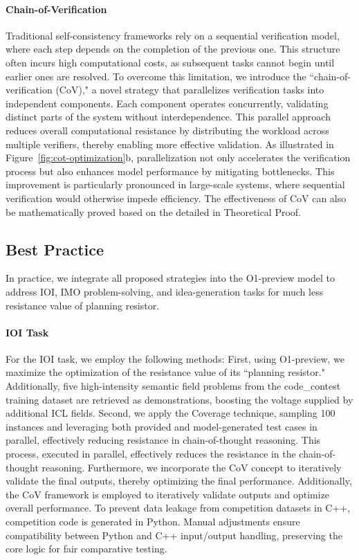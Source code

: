 \paragraph{Chain-of-Verification}
Traditional self-consistency frameworks rely on a sequential verification model, where each step depends on the completion of the previous one. This structure often incurs high computational costs, as subsequent tasks cannot begin until earlier ones are resolved. To overcome this limitation, we introduce the ``chain-of-verification (CoV)," a novel strategy that parallelizes verification tasks into independent components. Each component operates concurrently, validating distinct parts of the system without interdependence. This parallel approach reduces overall computational resistance by distributing the workload across multiple verifiers, thereby enabling more effective validation. As illustrated in Figure~\ref{fig:cot-optimization}b, parallelization not only accelerates the verification process but also enhances model performance by mitigating bottlenecks. This improvement is particularly pronounced in large-scale systems, where sequential verification would otherwise impede efficiency. The effectiveness of CoV can also be mathematically proved based on the \modelname{} detailed in Theoretical Proof.

\subsection{Best Practice}
In practice, we integrate all proposed strategies into the O1-preview model to address IOI, IMO problem-solving, and idea-generation tasks for much less resistance value of  planning resistor.

\paragraph{IOI Task}
For the IOI task, we employ the following methods: First, using O1-preview, we maximize the optimization of the resistance value of its ``planning resistor." Additionally, five high-intensity semantic field problems from the code\_contest training dataset are retrieved as demonstrations, boosting the voltage supplied by additional ICL fields. Second, we apply the Coverage technique, sampling 100 instances and leveraging both provided and model-generated test cases in parallel, effectively reducing resistance in chain-of-thought reasoning. This process, executed in parallel, effectively reduces the resistance in the chain-of-thought reasoning. Furthermore, we incorporate the CoV concept to iteratively validate the final outputs, thereby optimizing the final performance. Additionally, the CoV framework is employed to iteratively validate outputs and optimize overall performance. To prevent data leakage from competition datasets in C++, competition code is generated in Python. Manual adjustments ensure compatibility between Python and C++ input/output handling, preserving the core logic for fair comparative testing.

